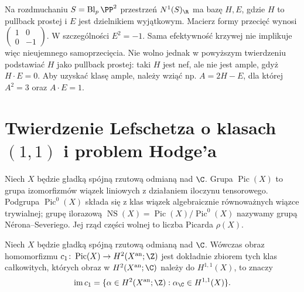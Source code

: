 \begin{przyklad}
Na rozdmuchaniu $S=\operatorname{Bl}_p\PP^2$
przestrzeń $N^1(S)_{\R}$ ma bazę $H,E$,
gdzie $H$ to pullback prostej i $E$ jest dzielnikiem
wyjątkowym. Macierz formy przecięć wynosi
$\left(\begin{smallmatrix}1&0\\0&-1\end{smallmatrix}\right)$.
W szczególności $E^2=-1$. Sama efektywność krzywej
nie implikuje więc nieujemnego samoprzecięcia.
Nie wolno jednak w powyższym twierdzeniu podstawiać
$H$ jako pullback prostej: taki $H$ jest nef, ale
nie jest ample, gdyż $H\cdot E=0$.
Aby uzyskać klasę ample, należy wziąć np.
$A=2H-E$, dla której $A^2=3$ oraz $A\cdot E=1$.
\end{przyklad}

\section{Twierdzenie Lefschetza o klasach \texorpdfstring{$(1,1)$}{(1,1)} i problem Hodge'a}
\label{sec:ga10-11}

\begin{definicja}
Niech $X$ będzie gładką spójną rzutową odmianą nad $\C$.
Grupa $\operatorname{Pic}(X)$ to grupa izomorfizmów
wiązek liniowych z działaniem iloczynu tensorowego.
Podgrupa $\operatorname{Pic}^0(X)$ składa się z klas
wiązek algebraicznie równoważnych wiązce trywialnej;
grupę ilorazową
$\operatorname{NS}(X)=\operatorname{Pic}(X)/\operatorname{Pic}^0(X)$
nazywamy grupą Nérona--Severiego.
Jej rząd części wolnej to liczba Picarda $\rho(X)$.
\end{definicja}

\begin{twierdzenie}
\label{tw:ga10-11}
Niech $X$ będzie gładką spójną rzutową odmianą nad $\C$.
Wówczas obraz homomorfizmu
$c_1\colon\operatorname{Pic}(X)\to H^2(X^{\rm an};\Z)$
jest dokładnie zbiorem tych klas całkowitych,
których obraz w $H^2(X^{\rm an};\C)$ należy do
$H^{1,1}(X)$, to znaczy
\[
 \operatorname{im}c_1
 =\{\alpha\in H^2(X^{\rm an};\Z):
 \alpha_{\C}\in H^{1,1}(X)\}.
\]
\end{twierdzenie}

